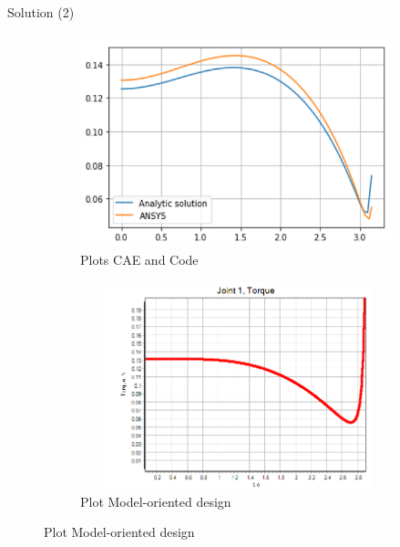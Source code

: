 \documentclass[aspectratio=169]{beamer}
\begin{document}
\begin{frame}[t]{Solution (2)}
\framesubtitle{}
    \vspace{-0.6cm}

    \begin{figure}[H]
        \begin{subfigure}{0.49\textwidth}
            \centering\includegraphics[height=6cm,width=1\textwidth,keepaspectratio]{plots_code_ansys.png}
            \caption*{Plots CAE and Code}
            \label{fig:plots_code_ansys.png}
        \end{subfigure}
        \begin{subfigure}{0.49\textwidth}
            \centering\includegraphics[height=6cm,width=1\textwidth,keepaspectratio]{plot_simintech.png}
            \caption*{Plot Model-oriented design}
            \label{fig:plot_simintech.png}
        \end{subfigure}
    \end{figure}
\end{frame}
\end{document}
